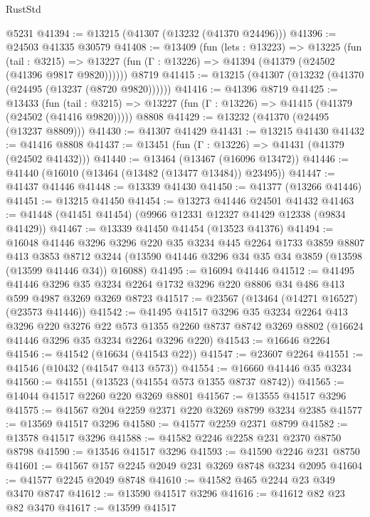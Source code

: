 \begin{lexlean}{RustStd}
\begin{coremodule}
    @5231
@41394 := @13215 (@41307 (@13232 (@41370 @24496)))
@41396 := @24503 @41335 @30579
@41408 := @13409
    (fun (lets : @13223) =>
    @13225
      (fun (tail : @3215) =>
      @13227 (fun (Γ : @13226) => @41394 (@41379 (@24502 (@41396 @9817 @9820))))))
    @8719
@41415 := @13215 (@41307 (@13232 (@41370 (@24495 (@13237 (@8720 @9820))))))
@41416 := @41396 @8719
@41425 := @13433
    (fun (tail : @3215) => @13227 (fun (Γ : @13226) => @41415 (@41379 (@24502 (@41416 @9820)))))
    @8808
@41429 := @13232 (@41370 (@24495 (@13237 @8809)))
@41430 := @41307 @41429
@41431 := @13215 @41430
@41432 := @41416 @8808
@41437 := @13451 (fun (Γ : @13226) => @41431 (@41379 (@24502 @41432)))
@41440 := @13464 (@13467 (@16096 @13472))
@41446 := @41440 (@16010 (@13464 (@13482 (@13477 @13484)) @23495))
@41447 := @41437 @41446
@41448 := @13339 @41430
@41450 := @41377 (@13266 @41446)
@41451 := @13215 @41450
@41454 := @13273 @41446 @24501 @41432
@41463 := @41448 (@41451 @41454) (@9966 @12331 @12327 @41429 @12338 (@9834 @41429))
@41467 := @13339 @41450 @41454 (@13523 @41376)
@41494 := @16048
    @41446
    @3296
    @3296
    @220
    @35
    @3234
    @445
    @2264
    @1733
    @3859
    @8807
    @413
    @3853
    @8712
    @3244
    (@13590 @41446 @3296 @34 @35 @34 @3859 (@13598 (@13599 @41446 @34)) @16088)
@41495 := @16094 @41446
@41512 := @41495
    @41446
    @3296
    @35
    @3234
    @2264
    @1732
    @3296
    @220
    @8806
    @34
    @486
    @413
    @599
    @4987
    @3269
    @3269
    @8723
@41517 := @23567 (@13464 (@14271 @16527) (@23573 @41446))
@41542 := @41495
    @41517
    @3296
    @35
    @3234
    @2264
    @413
    @3296
    @220
    @3276
    @22
    @573
    @1355
    @2260
    @8737
    @8742
    @3269
    @8802
    (@16624 @41446 @3296 @35 @3234 @2264 @3296 @220)
@41543 := @16646 @2264
@41546 := @41542 (@16634 (@41543 @22))
@41547 := @23607 @2264
@41551 := @41546 (@10432 (@41547 @413 @573))
@41554 := @16660 @41446 @35 @3234
@41560 := @41551 (@13523 (@41554 @573 @1355 @8737 @8742))
@41565 := @14044 @41517 @2260 @220 @3269 @8801
@41567 := @13555 @41517 @3296
@41575 := @41567 @204 @2259 @2371 @220 @3269 @8799 @3234 @2385
@41577 := @13569 @41517 @3296
@41580 := @41577 @2259 @2371 @8799
@41582 := @13578 @41517 @3296
@41588 := @41582 @2246 @2258 @231 @2370 @8750 @8798
@41590 := @13546 @41517 @3296
@41593 := @41590 @2246 @231 @8750
@41601 := @41567 @157 @2245 @2049 @231 @3269 @8748 @3234 @2095
@41604 := @41577 @2245 @2049 @8748
@41610 := @41582 @465 @2244 @23 @349 @3470 @8747
@41612 := @13590 @41517 @3296
@41616 := @41612 @82 @23 @82 @3470
@41617 := @13599 @41517

\end{coremodule}
\end{lexlean}
